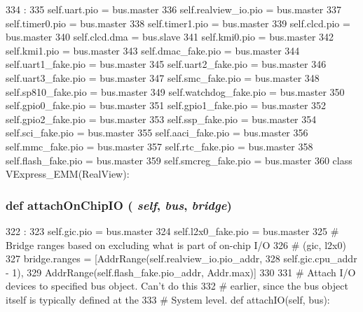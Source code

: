\begin{DoxyCode}
334                            :
335        self.uart.pio          = bus.master
336        self.realview_io.pio   = bus.master
337        self.timer0.pio        = bus.master
338        self.timer1.pio        = bus.master
339        self.clcd.pio          = bus.master
340        self.clcd.dma          = bus.slave
341        self.kmi0.pio          = bus.master
342        self.kmi1.pio          = bus.master
343        self.dmac_fake.pio     = bus.master
344        self.uart1_fake.pio    = bus.master
345        self.uart2_fake.pio    = bus.master
346        self.uart3_fake.pio    = bus.master
347        self.smc_fake.pio      = bus.master
348        self.sp810_fake.pio    = bus.master
349        self.watchdog_fake.pio = bus.master
350        self.gpio0_fake.pio    = bus.master
351        self.gpio1_fake.pio    = bus.master
352        self.gpio2_fake.pio    = bus.master
353        self.ssp_fake.pio      = bus.master
354        self.sci_fake.pio      = bus.master
355        self.aaci_fake.pio     = bus.master
356        self.mmc_fake.pio      = bus.master
357        self.rtc_fake.pio      = bus.master
358        self.flash_fake.pio    = bus.master
359        self.smcreg_fake.pio   = bus.master
360 
class VExpress_EMM(RealView):
\end{DoxyCode}
\hypertarget{classRealView_1_1RealViewEB_abd74cec934f25d2881d5fdd0d5e7f512}{
\subsubsection[{attachOnChipIO}]{\setlength{\rightskip}{0pt plus 5cm}def attachOnChipIO ( {\em self}, \/   {\em bus}, \/   {\em bridge})}}
\label{classRealView_1_1RealViewEB_abd74cec934f25d2881d5fdd0d5e7f512}



\begin{DoxyCode}
322                                          :
323        self.gic.pio = bus.master
324        self.l2x0_fake.pio = bus.master
325        # Bridge ranges based on excluding what is part of on-chip I/O
326        # (gic, l2x0)
327        bridge.ranges = [AddrRange(self.realview_io.pio_addr,
328                                   self.gic.cpu_addr - 1),
329                         AddrRange(self.flash_fake.pio_addr, Addr.max)]
330 
331     # Attach I/O devices to specified bus object.  Can't do this
332     # earlier, since the bus object itself is typically defined at the
333     # System level.
    def attachIO(self, bus):
\end{DoxyCode}


